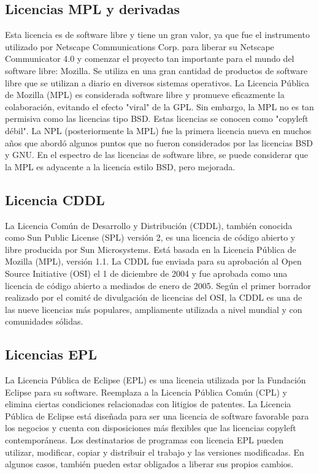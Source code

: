			\subsection{Licencias MPL y derivadas}\label{mpl}
			
					Esta licencia es de software libre y tiene un gran valor, ya que fue el instrumento utilizado por Netscape Communications Corp. para liberar su Netscape Communicator 4.0 y comenzar el proyecto tan importante para el mundo del software libre: Mozilla. Se utiliza en una gran cantidad de productos de software libre que se utilizan a diario en diversos sistemas operativos. La Licencia Pública de Mozilla (MPL) es considerada software libre y promueve eficazmente la colaboración, evitando el efecto "viral" de la GPL. Sin embargo, la MPL no es tan permisiva como las licencias tipo BSD. Estas licencias se conocen como "copyleft débil". La NPL (posteriormente la MPL) fue la primera licencia nueva en muchos años que abordó algunos puntos que no fueron considerados por las licencias BSD y GNU. En el espectro de las licencias de software libre, se puede considerar que la MPL es adyacente a la licencia estilo BSD, pero mejorada.\par
			
			\subsection{Licencia CDDL}\label{cddl}
			
				La Licencia Común de Desarrollo y Distribución (CDDL), también conocida como Sun Public License (SPL) versión 2, es una licencia de código abierto y libre producida por Sun Microsystems. Está basada en la Licencia Pública de Mozilla (MPL), versión 1.1. La CDDL fue enviada para su aprobación al Open Source Initiative (OSI) el 1 de diciembre de 2004 y fue aprobada como una licencia de código abierto a mediados de enero de 2005. Según el primer borrador realizado por el comité de divulgación de licencias del OSI, la CDDL es una de las nueve licencias más populares, ampliamente utilizada a nivel mundial y con comunidades sólidas.\par
				
			\subsection{Licencias EPL}\label{epl}
			
				La Licencia Pública de Eclipse (EPL) es una licencia utilizada por la Fundación Eclipse para su software. Reemplaza a la Licencia Pública Común (CPL) y elimina ciertas condiciones relacionadas con litigios de patentes. La Licencia Pública de Eclipse está diseñada para ser una licencia de software favorable para los negocios y cuenta con disposiciones más flexibles que las licencias copyleft contemporáneas. Los destinatarios de programas con licencia EPL pueden utilizar, modificar, copiar y distribuir el trabajo y las versiones modificadas. En algunos casos, también pueden estar obligados a liberar sus propios cambios.\par
			
